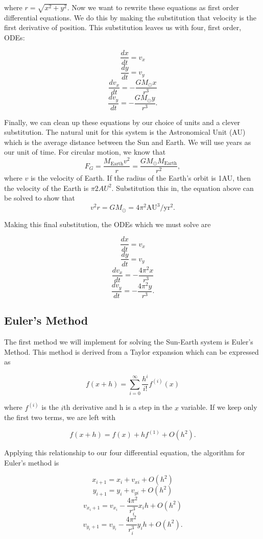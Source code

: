 \documentclass[%
oneside,                 %
final,                   %
10pt]{article}
\begin{document}
where $ r=\sqrt{x^2+y^2} $.  Now we want to rewrite these equations as first order differential equations.  We do this by making the substitution that velocity is the first derivative of position.  This substitution leaves us with four, first order, ODEs:

\[
\frac{dx}{dt}=v_x
\]
\[
\frac{dy}{dt}=v_y
\]
\[
\frac{dv_x}{dt}=-\frac{GM_{\odot}x}{r^3}
\]
\[
\frac{dv_y}{dt}=-\frac{GM_{\odot}y}{r^3}.
\]

Finally, we can clean up these equations by our choice of units and a clever substitution.  The natural unit for this system is the Astronomical Unit (AU) which is the average distance between the Sun and Earth.  We will use years as our unit of time.  For circular motion, we know that 
\[
F_G= \frac{M_{\mathrm{Earth}}v^2}{r}=\frac{GM_{\odot}M_{\mathrm{Earth}}}{r^2},
\]
where $v$ is the velocity of Earth.  If the radius of the Earth's orbit is 1AU, then the velocity of the Earth is $\pi 2AU^2$.  Substitution this in, the equation above can be solved to show that 
\[
v^2r=GM_{\odot}=4\pi^2\mathrm{AU}^3/\mathrm{yr}^2.
\]

Making this final substitution, the ODEs which we must solve are

\[
\frac{dx}{dt}=v_x
\]
\[
\frac{dy}{dt}=v_y
\]
\[
\frac{dv_x}{dt}=-\frac{4 \pi^2 x}{r^3}
\]
\[
\frac{dv_y}{dt}=-\frac{4 \pi^2 y}{r^3}.
\]


\subsection{Euler's Method}

The first method we will implement for solving the Sun-Earth system is Euler's Method.  This method is derived from a Taylor expansion which can be expressed as 

\[
f(x+h) = \sum_{i=0}^{\infty} \frac{h^i}{i!}f^{(i)}(x)
\]

where $f^{(i)}$ is the $i$th derivative and h is a step in the $x$ variable.  If we keep only the first two terms, we are left with

\[
f(x+h) = f(x) + hf^{(1)} +O(h^2).
\]

Applying this relationship to our four differential equation, the algorithm for Euler's method is

\[
x_{i+1} = x_i +v_{xi} + O(h^2)
\]
\[
y_{i+1} = y_i +v_{yi} + O(h^2)
\]
\[
v_{x_i+1} = v_{x_i} -\frac{4 \pi^2}{r_i^3}x_i h + O(h^2)
\]
\[
v_{y_i+1} = v_{y_i} -\frac{4 \pi^2}{r_i^3}y_i h + O(h^2).
\]
\end{document}
